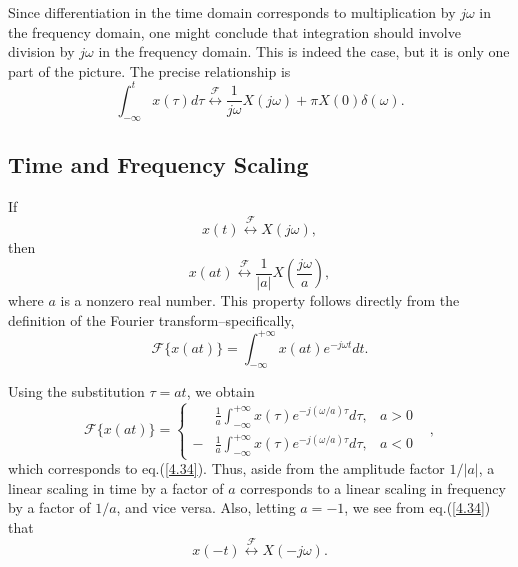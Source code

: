 \documentclass[a4paper,10pt,twoside]{book}
\begin{document}
Since differentiation in the time domain corresponds to multiplication by $j\omega$ in the frequency domain, one might conclude that integration should involve division by $j\omega$ in the frequency domain. This is indeed the case, but it is only one part of the picture. The precise relationship is
\begin{equation}
    \boxed{\int_{-\infty}^tx(\tau)d\tau\overset{\mathcal{F}}{\longleftrightarrow}\frac1{j\omega}X(j\omega)+\pi X(0)\delta(\omega).}
    \label{4.32}
\end{equation}

\subsection{Time and Frequency Scaling}

If $$x(t)\overset{\mathcal{F}}{\longleftrightarrow}X(j\omega),$$ then
\begin{equation}
    \boxed{x(at)\overset{\mathcal{F}}{\longleftrightarrow}\dfrac1{|a|}X\left(\dfrac{j\omega}a\right),}
    \label{4.34}
\end{equation}
where $a$ is a nonzero real number. This property follows directly from the definition of the Fourier transform--specifically, $$\mathcal{F}\{x(at)\}=\int_{-\infty}^{+\infty}x(at)e^{-j\omega t}dt.$$

Using the substitution $\tau=at$, we obtain $$\mathcal{F}\{x(at)\}=\left\{\begin{aligned}&\frac1a\int_{-\infty}^{+\infty}x(\tau)e^{-j(\omega/a)\tau}d\tau,&a>0\\-&\frac1a\int_{-\infty}^{+\infty}x(\tau)e^{-j(\omega/a)\tau}d\tau,&a<0&\end{aligned}\right.,$$ which corresponds to eq.\;(\ref{4.34}). Thus, aside from the amplitude factor $1/|a|$, a linear scaling in time by a factor of $a$ corresponds to a linear scaling in frequency by a factor of $1/a$, and vice versa. Also, letting $a=-1$, we see from eq.\;(\ref{4.34}) that
\begin{equation}
    \boxed{x(-t)\overset{\mathcal{F}}{\longleftrightarrow}X(-j\omega).}
    \label{4.35}
\end{equation}
\end{document}
